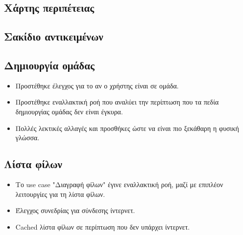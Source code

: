 \subsection{Χάρτης περιπέτειας}
\subsection{Σακίδιο αντικειμένων}
\subsection{Δημιουργία ομάδας}
\begin{itemize}
    \item Προστέθηκε έλεγχος για το αν ο χρήστης είναι σε ομάδα.
    \item Προστέθηκε εναλλακτική ροή που αναλύει την περίπτωση που τα πεδία δημιουργίας ομάδας δεν είναι έγκυρα.
    \item Πολλές λεκτικές αλλαγές και προσθήκες ώστε να είναι πιο ξεκάθαρη η φυσική γλώσσα.
\end{itemize}
\subsection{Λίστα φίλων}
\begin{itemize}
    \item Το use case "Διαγραφή φίλων" έγινε εναλλακτική ροή, μαζί με επιπλέον λειτουργίες για τη λίστα φίλων.
    \item Έλεγχος συνεδρίας για σύνδεσης ίντερνετ.
    \item Cached λίστα φίλων σε περίπτωση που δεν υπάρχει ίντερνετ.
\end{itemize}


\clearpage